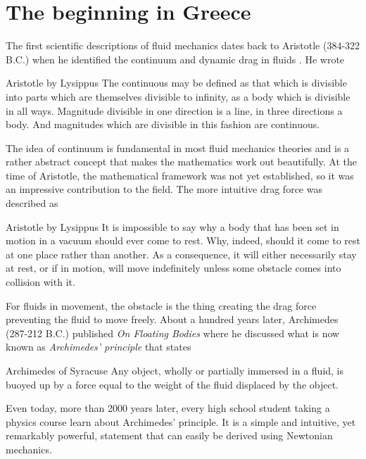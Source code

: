 \section{The beginning in Greece}
\label{sec:theory_of_fluids_greece}
The first scientific descriptions of fluid mechanics dates back to Aristotle (384-322 B.C.) when he identified the continuum and dynamic drag in fluids \cite{anderson1998history}. He wrote
\begin{aquote}{Aristotle by Lysippus}
The continuous may be defined as that which is divisible into parts which are themselves divisible to infinity, as a body which is divisible in all ways. Magnitude divisible in one direction is a line, in three directions a body. And magnitudes which are divisible in this fashion are continuous. 
\end{aquote}
The idea of continuum is fundamental in most fluid mechanics theories and is a rather abstract concept that makes the mathematics work out beautifully. At the time of Aristotle, the mathematical framework was not yet established, so it was an impressive contribution to the field. The more intuitive drag force was described as
\begin{aquote}{Aristotle by Lysippus}
It is impossible to say why a body that has been set in motion in a vacuum should ever come to rest. Why, indeed, should it come to rest at one place rather than another. As a consequence, it will either necessarily stay at rest, or if in motion, will move indefinitely unless some obstacle comes into collision with it.
\end{aquote}
For fluids in movement, the obstacle is the thing creating the drag force preventing the fluid to move freely. About a hundred years later, Archimedes (287-212 B.C.) published \textit{On Floating Bodies} where he discussed what is now known as \textit{Archimedes' principle} that states
\begin{aquote}{Archimedes of Syracuse}
Any object, wholly or partially immersed in a fluid, is buoyed up by a force equal to the weight of the fluid displaced by the object.
\end{aquote}
Even today, more than 2000 years later, every high school student taking a physics course learn about Archimedes' principle. It is a simple and intuitive, yet remarkably powerful, statement that can easily be derived using Newtonian mechanics. 

